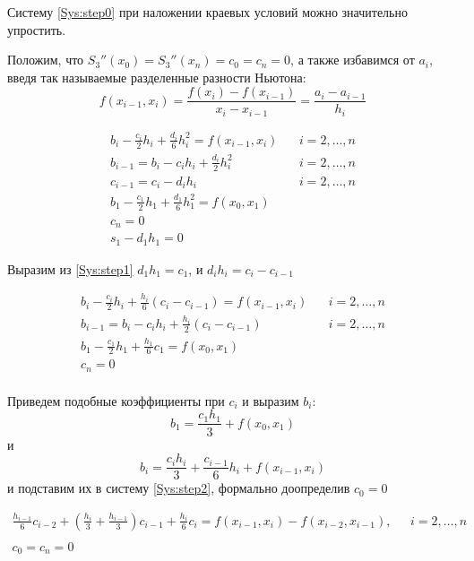 Систему \eqref{Sys:step0} при наложении краевых условий можно значительно упростить.

Положим, что $S_3''(x_0) = S_3''(x_n) = c_0 = c_n = 0$, а также избавимся от $a_i$, введя так называемые разделенные разности Ньютона:
$$f(x_{i-1}, x_i) = \frac{f(x_i) - f(x_{i-1})}{x_i - x_{i-1}} = \frac{a_i - a_{i-1}}{h_i}$$

\begingroup
\Large
\begin{equation}
\begin{array}{lr}
     b_i - \frac{c_i}{2}h_i + \frac{d_i}{6}h_i^2= f(x_{i-1}, x_i)\ \ \ \  & i = 2,\dots, n  \\
     b_{i-1} = b_i - c_i h_i +\frac{d_i}{2}h_i^2 & i = 2,\dots, n  \\
     c_{i-1} = c_i - d_i h_i & i = 2,\dots, n  \\
     b_1 - \frac{c_1}{2} h_1 + \frac{d_1}{6} h_1^2 = f(x_0,x_1)
     & \\
     c_n = 0 & \\
     s_1 - d_1 h_1 = 0 &
\end{array}
\label{Sys:step1}
\end{equation}
\endgroup

Выразим из \eqref{Sys:step1} $d_1 h_1 = c_1$, и $d_i h_i = c_i - c_{i -1}$

\begingroup
\Large
\begin{equation}
\begin{array}{lr}
     b_i - \frac{c_i}{2}h_i + \frac{h_i}{6}(c_i - c_{i-1})= f(x_{i-1}, x_i)\ \ \ \  & i = 2,\dots, n  \\
     b_{i-1} = b_i - c_i h_i +\frac{h_i}{2}(c_i - c_{i-1}) & i = 2,\dots, n  \\
     b_1 - \frac{c_1}{2} h_1 + \frac{h_1}{6} c_1 = f(x_0,x_1)
     & \\
     c_n = 0 & \\
\end{array}
\label{Sys:step2}
\end{equation}
\endgroup

Приведем подобные коэффициенты при $c_i$ и выразим $b_i$: $$b_1 = \frac{c_1 h_1}{3} + f(x_0,x_1)$$ и $$b_i = \frac{c_i h_i}{3} + \frac{c_{i-1}}{6} h_i + f(x_{i-1}, x_i)$$ и подставим их в систему \eqref{Sys:step2}, формально доопределив $c_0 = 0$

\begin{equation}
\begin{array}{lr}
    \frac{h_{i-1}}{6}c_{i-2} + (\frac{h_i}{3} + \frac{h_{i-1}}{3}) c_{i-1} + \frac{h_i}{6}c_i = f(x_{i-1},x_i) - f(x_{i-2}, x_{i-1}),\ \ \ & i = 2,\dots,n \\
    & \\
    c_0 = c_n = 0 &
\end{array}
\label{Sys:step3}
\end{equation}

